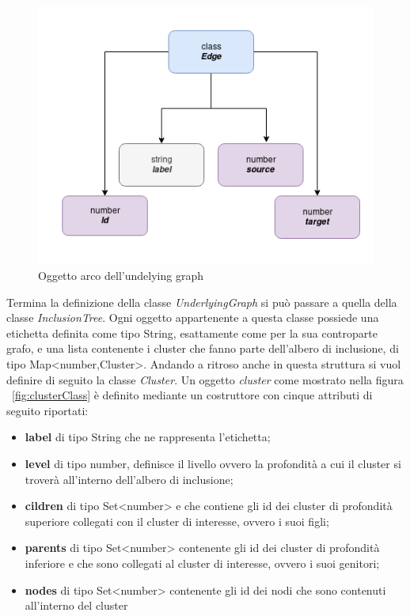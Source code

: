{\begin{figure}[!htb]
\begin{center}
		\includegraphics[width=1 \linewidth]{figure/edgeClass}
	\end{center}
	\caption{Oggetto arco dell'undelying graph\label{fig:edgeClass}}
\end{figure}

Termina la definizione della classe \textit{UnderlyingGraph} si può passare a quella della classe \textit{InclusionTree}. Ogni oggetto appartenente a questa classe possiede una etichetta definita come tipo String, esattamente come per la sua controparte grafo, e una lista contenente i cluster che fanno parte dell'albero di inclusione, di tipo Map<number,Cluster>.
Andando a ritroso anche in questa struttura si vuol definire di seguito la classe \textit{Cluster}.
Un oggetto \textit{cluster} come mostrato nella figura \figurename~\ref{fig:clusterClass} è definito mediante un costruttore con cinque attributi di seguito riportati:
\begin{itemize}
	\item \textbf{label} di tipo String che ne rappresenta l'etichetta;
	\item \textbf{level} di tipo number, definisce il livello ovvero la profondità a cui il cluster si troverà all'interno dell'albero di inclusione;
	\item \textbf{cildren} di tipo Set<number> e che contiene gli id dei cluster di profondità superiore collegati con il cluster di interesse, ovvero i suoi figli;
	\item \textbf{parents} di tipo Set<number> contenente gli id dei cluster di profondità inferiore e che sono collegati al cluster di interesse, ovvero i suoi genitori;
	\item \textbf{nodes} di tipo Set<number> contenente gli id dei nodi che sono contenuti all'interno del cluster
\end{itemize}

}
